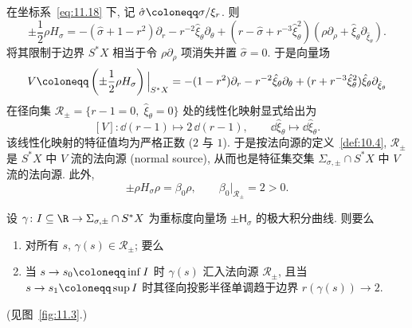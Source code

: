 \begin{lemma}\label{lem:11.4}
在坐标系~\eqref{eq:11.18} 下, 记 $\hat{\sigma} \defeq \sigma/\xi_r$. 则
\begin{equation}\label{eq:11.22}
    \pm \frac{1}{2} \rho H_\sigma = -(\hat{\sigma} + 1 - r^2) \partial_r - r^{-2}\hat{\xi}_\theta \partial_\theta + (r - \hat{\sigma} + r^{-3}\hat{\xi}_\theta^2)(\rho\partial_\rho + \hat{\xi}_\theta \partial_{\hat{\xi}_\theta}).
\end{equation}
将其限制于边界 $S^* X$ 相当于令 $\rho \partial_\rho$ 项消失并置 $\hat{\sigma} = 0$. 于是向量场
\begin{equation}\label{eq:11.23}
    V \defeq \left( \pm \frac{1}{2} \rho H_\sigma \right)\Big|_{S^* X} = -(1 - r^2)\partial_r - r^{-2}\hat{\xi}_\theta \partial_\theta + (r + r^{-3}\hat{\xi}_\theta^2)\hat{\xi}_\theta \partial_{\hat{\xi}_\theta}
\end{equation}
在径向集 $\mathcal{R}_\pm = \{r - 1 = 0, \; \hat{\xi}_\theta = 0\}$ 处的线性化映射显式给出为
\begin{equation}\label{eq:11.24}
    [V] \colon \dd(r - 1) \mapsto 2 \,\dd(r - 1), \qquad \dd\hat{\xi}_\theta \mapsto \dd\hat{\xi}_\theta.
\end{equation}
该线性化映射的特征值均为严格正数 ($2$ 与 $1$). 于是按法向源的定义~\ref{def:10.4}, $\mathcal{R}_\pm$ 是 $S^* X$ 中 $V$ 流的法向源 (normal source), 从而也是特征集交集 $\Sigma_{\sigma, \pm} \cap S^* X$ 中 $V$ 流的法向源. 此外,
\begin{equation}\label{eq:11.25}
    \pm \rho H_\sigma \rho = \beta_0 \rho, \qquad \beta_0|_{\mathcal{R}_\pm} = 2 > 0.
\end{equation}
\end{lemma}

\begin{proposition}\label{prop:11.5}
设 $\gamma \colon I \subseteq \R \to \Sigma_{\sigma, \pm} \cap S^* X$ 为重标度向量场 $\pm \mathsf{H}_\sigma$ 的极大积分曲线. 则要么
\begin{enumerate}[label=(\arabic*)]
    \item 对所有 $s$, $\gamma(s) \in \mathcal{R}_\pm$; 要么
    \item 当 $s \to s_0 \defeq \inf I$ 时 $\gamma(s)$ 汇入法向源 $\mathcal{R}_\pm$, 且当 $s \to s_1 \defeq \sup I$ 时其径向投影半径单调趋于边界 $r(\gamma(s)) \to 2$.
\end{enumerate}
(见图~\ref{fig:11.3}.)
\end{proposition}

